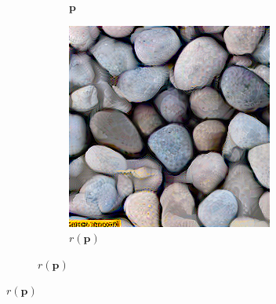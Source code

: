 \begin{figure}[]
\begin{subfigure}{\textwidth}
\begin{subfigure}{0.24\textwidth}
            \caption{\(\bm{p}\)}
            \label{fig:ex01-pebbles-1000steps-some_im}
        \end{subfigure}
        \hfill
        \begin{subfigure}{0.24\textwidth}
            \centering
            \includegraphics[width=\textwidth]{images/04-experiment01/pebbles/1000/some_proj.jpg}
            \caption{\(r(\bm{p})\)}
            \label{fig:ex01-pebbles-1000steps-some_proj}
        \end{subfigure}
        

\end{subfigure}
\end{figure}
